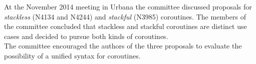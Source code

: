 At the November 2014 meeting in Urbana the committee discussed proposals for
\emph{stackless} (N4134\cite{N4134} and N4244\cite{N4244}) and \emph{stackful}
(N3985\cite{N3985}) coroutines. The members of the committee concluded that
stackless and stackful coroutines are distinct use cases and decided to pursue
both kinds of coroutines.\\
The committee encouraged the authors of the three proposals to evaluate the
possibility of a unified syntax for coroutines.
